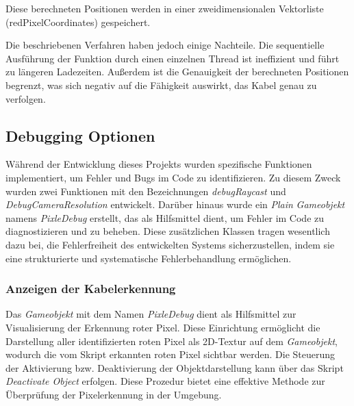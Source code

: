 \begin{itemize}
    Diese berechneten Positionen werden in einer zweidimensionalen Vektorliste (redPixelCoordinates) gespeichert.

    Die beschriebenen Verfahren haben jedoch einige Nachteile. Die sequentielle Ausführung der Funktion durch einen einzelnen Thread ist ineffizient und führt zu längeren Ladezeiten. Außerdem ist die Genauigkeit der berechneten Positionen begrenzt, was sich negativ auf die Fähigkeit auswirkt, das Kabel genau zu verfolgen.

    \subsection{Debugging Optionen}
    Während der Entwicklung dieses Projekts wurden spezifische Funktionen implementiert, um Fehler und Bugs im Code zu identifizieren. Zu diesem Zweck wurden zwei Funktionen mit den Bezeichnungen \textit{debugRaycast} und \textit{DebugCameraResolution} entwickelt. Darüber hinaus wurde ein \textit{Plain} \textit{Gameobjekt} namens \textit{PixleDebug} erstellt, das als Hilfsmittel dient, um Fehler im Code zu diagnostizieren und zu beheben. Diese zusätzlichen Klassen tragen wesentlich dazu bei, die Fehlerfreiheit des entwickelten Systems sicherzustellen, indem sie eine strukturierte und systematische Fehlerbehandlung ermöglichen.

    \subsubsection{\label{sec:PlaneDebug}Anzeigen der Kabelerkennung}
    Das \textit{Gameobjekt} mit dem Namen \textit{PixleDebug} dient als Hilfsmittel zur Visualisierung der Erkennung roter Pixel. Diese Einrichtung ermöglicht die Darstellung aller identifizierten roten Pixel als 2D-Textur auf dem \textit{Gameobjekt}, wodurch die vom Skript erkannten roten Pixel sichtbar werden. Die Steuerung der Aktivierung bzw. Deaktivierung der Objektdarstellung kann über das Skript \textit{Deactivate Object} erfolgen. Diese Prozedur bietet eine effektive Methode zur Überprüfung der Pixelerkennung in der Umgebung.


\end{itemize}
